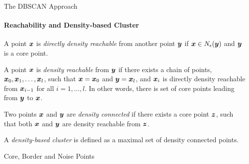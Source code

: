 \begin{frame}{The DBSCAN Approach}
\framesubtitle{Reachability and Density-based Cluster}

  A point ${\boldsymbol x}$ is {\em directly density reachable}
from another point ${\boldsymbol y}$ if ${\boldsymbol x} \in N_{\epsilon}({\boldsymbol y})$ and
${\boldsymbol y}$ is a core point. 

\medskip
A point ${\boldsymbol x}$ is {\em density
    reachable} from ${\boldsymbol y}$ if there exists a chain of points,
${\boldsymbol x}_0, {\boldsymbol x}_1, \ldots, {\boldsymbol x}_l$, such that
${\boldsymbol x} = {\boldsymbol x}_0$ and ${\boldsymbol y} = {\boldsymbol x}_l$, and
${\boldsymbol x}_i$ is
directly density reachable from ${\boldsymbol x}_{i-1}$ for all $i=1,\ldots,l$.
In other words,
there is set of core points leading from ${\boldsymbol y}$ to ${\boldsymbol x}$.

\medskip
Two points ${\boldsymbol x}$ and ${\boldsymbol y}$ are
{\em density connected}
if there exists a core point ${\boldsymbol z}$,
such that both ${\boldsymbol x}$ and ${\boldsymbol y}$ are density reachable from ${\boldsymbol z}$.

\medskip
A {\em density-based cluster} is def\/{i}ned as a maximal set of
density connected points.
\end{frame}


\begin{frame}[fragile]{Core, Border and Noise Points}
\begin{figure}[!ht]%
  \centerline{
  \hspace{1in}
  }
\end{figure}
\end{frame}


